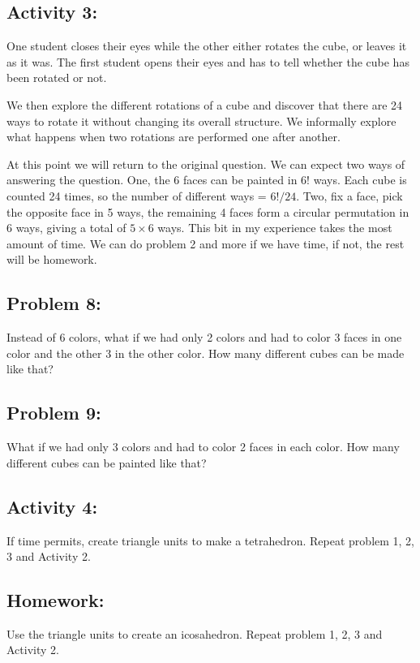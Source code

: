 \documentclass[12pt,a4paper]{program-proposal}
\begin{document}
\subsection{Activity 3:} One student closes their eyes while the other either rotates the cube, or leaves it as it was. The first student opens their eyes and has to tell whether the cube has been rotated or not. 

We then explore the different rotations of a cube and discover that there are 24 ways to rotate it without changing its overall structure. We informally explore what happens when two rotations are performed one after another.

At this point we will return to the original question. We can expect two ways of answering the question. One, the 6 faces can be painted in $6!$ ways. Each cube is counted 24 times, so the number of different ways = $6!/24$. Two, fix a face, pick the opposite face in 5 ways, the remaining 4 faces form a circular permutation in 6 ways, giving a total of $5\times 6$ ways. This bit in my experience takes the most amount of time. We can do problem 2 and more if we have time, if not, the rest will be homework.

\subsection{Problem 8:} Instead of 6 colors, what if we had only 2 colors and had to color 3 faces in one color and the other 3 in the other color. How many different cubes can be made like that?

\subsection{Problem 9:} What if we had only 3 colors and had to color 2 faces in each color. How many different cubes can be painted like that?

\subsection{Activity 4:} If time permits, create triangle units to make a tetrahedron. Repeat problem 1, 2, 3 and Activity 2.

\subsection{Homework:} Use the triangle units to create an icosahedron. Repeat problem 1, 2, 3 and Activity 2.
\end{document}
